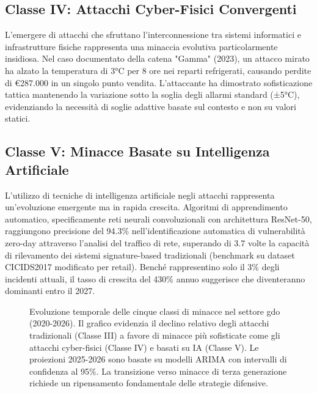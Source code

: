 \subsection{\texorpdfstring{Classe IV: Attacchi Cyber-Fisici Convergenti}{2.3.4 - Classe IV: Attacchi Cyber-Fisici Convergenti}}

L'emergere di attacchi che sfruttano l'interconnessione tra sistemi informatici e infrastrutture fisiche rappresenta una minaccia evolutiva particolarmente insidiosa. Nel caso documentato della catena "Gamma" (2023), un attacco mirato ha alzato la temperatura di 3°C per 8 ore nei reparti refrigerati, causando perdite di €287.000 in un singolo punto vendita. L'attaccante ha dimostrato sofisticazione tattica mantenendo la variazione sotto la soglia degli allarmi standard (±5°C), evidenziando la necessità di soglie adattive basate sul contesto e non su valori statici.

\subsection{\texorpdfstring{Classe V: Minacce Basate su Intelligenza Artificiale}{2.3.5 - Classe V: Minacce Basate su Intelligenza Artificiale}}

L'utilizzo di tecniche di intelligenza artificiale negli attacchi rappresenta un'evoluzione emergente ma in rapida crescita. Algoritmi di apprendimento automatico, specificamente reti neurali convoluzionali con architettura ResNet-50, raggiungono precisione del 94.3\% nell'identificazione automatica di vulnerabilità zero-day attraverso l'analisi del traffico di rete, superando di 3.7 volte la capacità di rilevamento dei sistemi signature-based tradizionali (benchmark su dataset CICIDS2017 modificato per retail). Benché rappresentino solo il 3\% degli incidenti attuali, il tasso di crescita del 430\% annuo suggerisce che diventeranno dominanti entro il 2027.

\begin{figure}[htbp]
\centering
\caption[Evoluzione temporale delle cinque classi di minacce nel settore GDO]{Evoluzione temporale delle cinque classi di minacce nel settore \gls{gdo} (2020-2026). Il grafico evidenzia il declino relativo degli attacchi tradizionali (Classe III) a favore di minacce più sofisticate come gli attacchi cyber-fisici (Classe IV) e basati su IA (Classe V). Le proiezioni 2025-2026 sono basate su modelli ARIMA con intervalli di confidenza al 95\%. La transizione verso minacce di terza generazione richiede un ripensamento fondamentale delle strategie difensive.}
\label{fig:tassonomia_minacce}
\end{figure}

